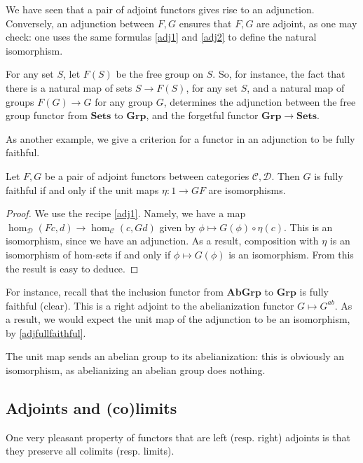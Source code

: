 We have seen that a pair of adjoint functors gives rise to an adjunction. 
Conversely, an adjunction between $F, G$ ensures that $F, G$ are adjoint, as
one may check: one uses the same formulas \eqref{adj1} and \eqref{adj2} to
define the natural isomorphism.


For any set $S$, let $F(S)$ be the free group on $S$.
So, for instance, the fact that there is a natural map of sets
$S \to F(S)$, for any set $S$, and a natural map of
groups $F(G) \to G$ for any group $G$, determines the adjunction between the
free group functor from $\mathbf{Sets}$ to $\mathbf{Grp}$, and the forgetful
functor $\mathbf{Grp} \to \mathbf{Sets}$.



As another example, we give a criterion for a functor in an adjunction to be
fully faithful.

\begin{proposition} \label{adjfullfaithful}
Let $F, G$ be a pair of adjoint functors between categories $\mathcal{C}, \mathcal{D}$.
Then $G$ is fully faithful if and only if the unit maps $\eta: 1 \to GF$ are
isomorphisms.
\end{proposition} 
\begin{proof} 
We use the recipe \eqref{adj1}.
Namely, we have a map $\hom_{\mathcal{D}}(Fc, d) \to 
\hom_{\mathcal{C}}(c, Gd)$ given by 
$\phi \mapsto G(\phi) \circ \eta(c)$. This is an isomorphism, since we have an
adjunction.
As a result, composition with $\eta$ is an isomorphism of hom-sets if and only if $\phi
\mapsto G(\phi)$ is an isomorphism. From this the result is easy to deduce.
\end{proof} 

\begin{example}
For instance, recall that the inclusion functor from $\mathbf{AbGrp}$ to
$\mathbf{Grp}$ is fully faithful (clear). 
This is a right adjoint to the abelianization functor $G \mapsto G^{ab}$.
As a result, we would expect the unit map of the adjunction to be an
isomorphism, by \cref{adjfullfaithful}.

The unit map sends an abelian group to its abelianization: this is obviously an
isomorphism, as abelianizing an abelian group does nothing.
\end{example}

\subsection{Adjoints and (co)limits}
One very pleasant property of functors that are left (resp. right) adjoints is
that they preserve all colimits (resp. limits).

